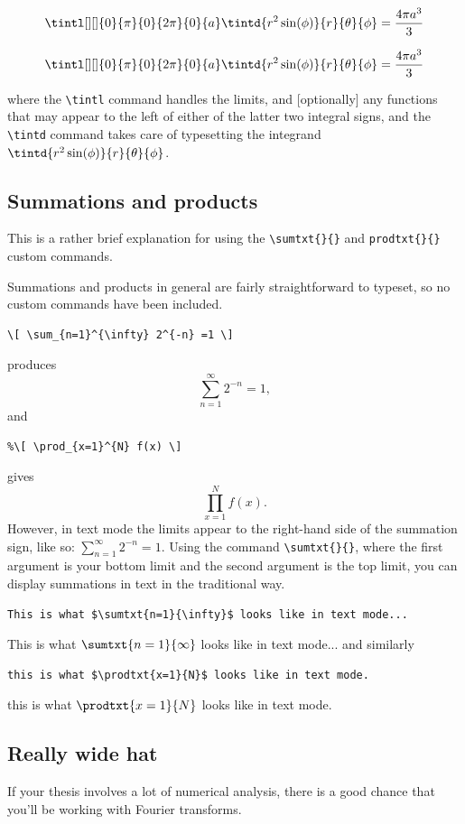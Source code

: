 \begin{spverbatim}
\[\tintl[][]{0}{\pi}{0}{2\pi}{0}{a} \tintd{r^2\sin(\phi)}{r}{\theta}{\phi} = \frac{4\pi a^3}{3}\]
\end{spverbatim}


\[\tintl[][]{0}{\pi}{0}{2\pi}{0}{a}\tintd{r^2\sin(\phi)}{r}{\theta}{\phi} = \frac{4\pi a^3}{3}\]

where the \verb|\tintl| command handles the limits, and [optionally] any functions that may appear to the left of either of the latter two integral signs, and the \verb|\tintd| command takes care of typesetting the integrand $\tintd{r^2\sin(\phi)}{r}{\theta}{\phi}$.


\subsection{Summations and products}
This is a rather brief explanation for using the \verb|\sumtxt{}{}| and \verb|prodtxt{}{}| custom commands.

Summations and products in general are fairly straightforward to typeset, so no custom commands have been included. 
\begin{verbatim}
\[ \sum_{n=1}^{\infty} 2^{-n} =1 \]
\end{verbatim}
produces
\[\sum_{n=1}^{\infty} 2^{-n} =1,\]
and
\begin{verbatim}
%\[ \prod_{x=1}^{N} f(x) \]
\end{verbatim}
gives
\[ \prod_{x=1}^{N} f(x). \]
However, in text mode the limits appear to the right-hand side of the summation sign, like so: $\sum_{n=1}^{\infty} 2^{-n} =1$. Using the command \verb|\sumtxt{}{}|, where the first argument is your bottom limit and the second argument is the top limit, you can display summations in text in the traditional way.
\begin{verbatim}
This is what $\sumtxt{n=1}{\infty}$ looks like in text mode...
\end{verbatim}
This is what $\sumtxt{n=1}{\infty}$ looks like in text mode...
and similarly 
\begin{verbatim}
this is what $\prodtxt{x=1}{N}$ looks like in text mode.
\end{verbatim}
this is what $\prodtxt{x=1}{N}$ looks like in text mode.
\subsection{Really wide hat}
If your thesis involves a lot of numerical analysis, there is a good chance that you'll be working with Fourier transforms. 


